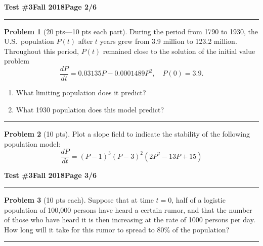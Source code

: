 \documentclass[12pt]{article}
\theoremstyle{definition}
\newtheorem{problem}{Problem}
\begin{document}
\hfill{\large\bf Test \#3}\hfill{\large\bf Fall 2018}\hfill{\large\bf Page 2/6}\hrule

\bigskip
\begin{problem}[20 pts---10 pts each part]
During the period from 1790 to 1930, the U.S.~population $P(t)$ after $t$ years grew from 3.9 million to 123.2 million.  Throughout this period, $P(t)$ remained close to the solution of the initial value problem
\begin{equation*}
\frac{dP}{dt} = 0.03135 P - 0.0001489 P^2, \quad P(0) = 3.9.
\end{equation*}
\begin{enumerate}
  \item What limiting population does it predict?
  \vspace{0.5cm}
  \begin{flushright}
  \end{flushright}
  \item What 1930 population does this model predict?
  \vspace{4cm}
  \begin{flushright}
  \end{flushright}
\end{enumerate}
\end{problem}
\hrule

\begin{problem}[10 pts]
  Plot a slope field to indicate the stability of the following population model:
  \begin{equation*}
    \frac{dP}{dt} = (P-1)^3(P-3)^2(2P^2-13P+15)
  \end{equation*}
\end{problem}

\newpage

\hfill{\large\bf Test \#3}\hfill{\large\bf Fall 2018}\hfill{\large\bf Page 3/6}\hrule

\bigskip
\begin{problem}[10 pts each]
  Suppose that at time $t=0$, half of a logistic population of 100,000 persons have heard a certain rumor, and that the
  number of those who have heard it is then increasing at the rate of 1000 persons per day. How long will it take for
  this rumor to spread to 80\% of the population?
  \vspace{5cm}
  \begin{flushright}
  \end{flushright}
\end{problem}
\hrule
\end{document}
